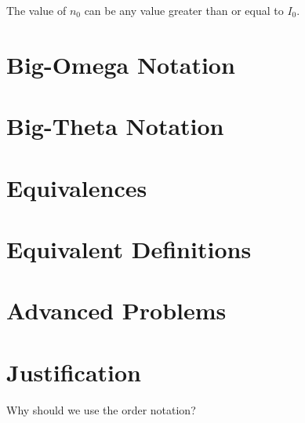 The value of $n_0$ can be any value greater than or equal to $I_0$.




\section{Big-Omega Notation}

\section{Big-Theta Notation}


\section{Equivalences}





\section{Equivalent Definitions}

\section{Advanced Problems}

\section{Justification}

Why should we use the order notation?

